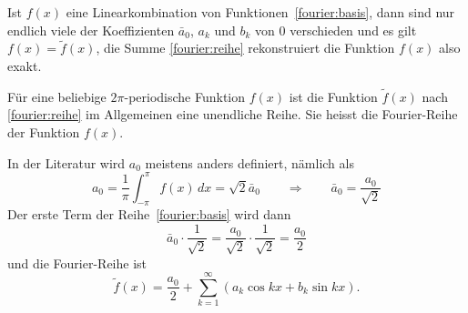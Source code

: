 Ist $f(x)$ eine Linearkombination von Funktionen~\eqref{fourier:basis},
dann sind nur endlich viele der Koeffizienten $\bar{a}_0$, $a_k$ und $b_k$
von $0$ verschieden und es gilt $f(x)=\tilde f(x)$, die Summe
\eqref{fourier:reihe} rekonstruiert die Funktion $f(x)$ also exakt.

Für eine beliebige $2\pi$-periodische Funktion $f(x)$ ist die Funktion
$\tilde f(x)$ nach \eqref{fourier:reihe} im Allgemeinen eine unendliche
Reihe.
Sie heisst die Fourier-Reihe der Funktion 
$f(x)$.

In der Literatur wird $a_0$ meistens anders definiert, nämlich als
\[
a_0 = \frac1{\pi}\int_{-\pi}^{\pi} f(x)\,dx = \!\sqrt{2}\bar{a}_0
\qquad\Rightarrow\qquad
\bar{a}_0 = \frac{a_0}{\!\sqrt{2}}
\]
Der erste Term der Reihe~\eqref{fourier:basis} wird dann
\[
\bar{a}_0\cdot\frac1{\!\sqrt{2}}
=
\frac{a_0}{\!\sqrt{2}}\cdot\frac{1}{\!\sqrt{2}}
=
\frac{a_0}2
\]
und die Fourier-Reihe ist
\begin{equation}
\tilde f(x)
=
\frac{a_0}2
+
\sum_{k=1}^\infty (a_k\cos kx+b_k\sin kx).
\end{equation}

